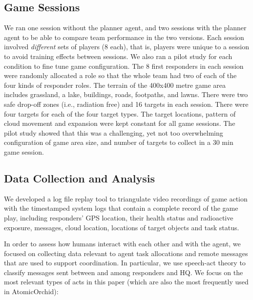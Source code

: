 \subsection{Game Sessions}
\noindent We ran one session without the planner agent, and two sessions with the planner agent to be able to compare team performance in the two versions. Each session involved \emph{different} sets of players (8 each), that is, players were unique to a session to avoid training effects between sessions. We also ran a pilot study for each condition to fine tune game configuration. The 8 first responders in each session were randomly allocated a role so that the whole team had two of each of the four kinds of responder roles. The terrain of the 400x400 metre  game area includes grassland, a lake, buildings, roads,  footpaths, and lawns. There were two safe drop-off zones (i.e., radiation free) and 16 targets in each session. There were four targets for each of the four target types. The target locations, pattern of cloud movement and expansion were kept constant for all game sessions. The pilot study showed that this was a challenging, yet not too overwhelming configuration of game area size, and number of targets to collect in a 30 min game session. 

\subsection{Data Collection and Analysis}
\noindent We developed a log file replay tool to triangulate video recordings of game action with the timestamped system logs that contain a complete record of the game play, including responders' GPS location, their health status and radioactive exposure, messages, cloud location, locations of target objects and task status.


In order to assess how humans interact with each other and with the agent, we focused on collecting data relevant to agent task allocations and remote messages  that are used to support coordination. In particular, we use speech-act theory \cite{searle:1975} to classify messages sent between and among responders and HQ. We focus on the most relevant types of acts in this paper (which are also the most frequently used in AtomicOrchid):

